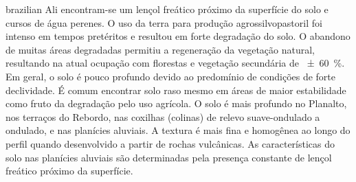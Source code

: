 \begin{chapterabstract}{brazilian}{\ptkeys}
Ali 
encontram-se um lençol freático próximo da superfície do solo e cursos de água perenes. O uso da terra para 
produção agrossilvopastoril foi intenso em tempos pretéritos e resultou em forte degradação do solo. O 
abandono 
de muitas áreas degradadas permitiu a regeneração da vegetação natural, resultando na atual ocupação com 
florestas e vegetação secundária de \SI{\pm60}{\percent}. Em geral, o solo é pouco profundo devido ao 
predomínio de condições de forte declividade. É comum encontrar solo raso mesmo em áreas de maior estabilidade 
como fruto da degradação pelo uso agrícola. O solo é mais profundo no Planalto, nos terraços do Rebordo, nas 
coxilhas (colinas) de relevo suave-ondulado a ondulado, e nas planícies aluviais. A textura é mais fina e 
homogênea ao 
longo do perfil quando desenvolvido a partir de rochas vulcânicas. As características do solo nas planícies 
aluviais são determinadas pela presença constante de lençol freático próximo da superfície.
\end{chapterabstract}

